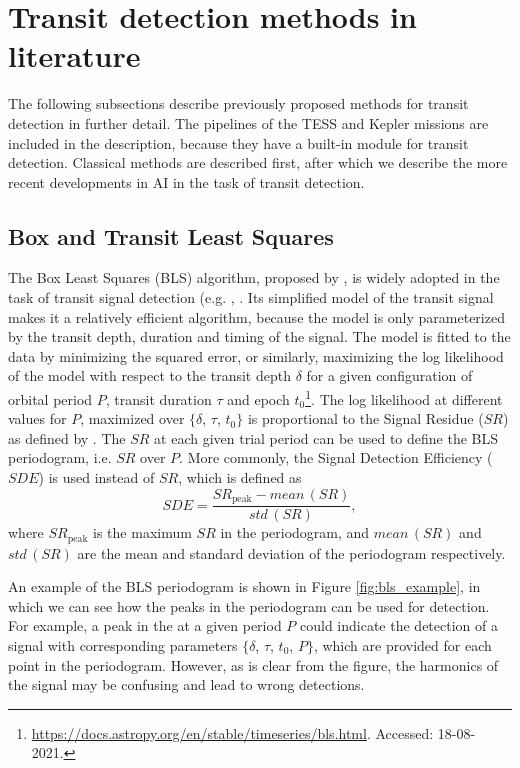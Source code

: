 
\section{Transit detection methods in literature}
\label{sec:detection_lit}

The following subsections describe previously proposed methods for transit detection in further detail. The pipelines of the TESS and Kepler missions are included in the description, because they have a built-in module for transit detection. Classical methods are described first, after which we describe the more recent developments in AI in the task of transit detection.

\subsection{Box and Transit Least Squares}

The Box Least Squares (BLS) algorithm, proposed by \cite{kovacs2002box}, is widely adopted in the task of transit signal detection (e.g. \cite{kunimoto2020searching}, \cite{rizzuto2020tess}. Its simplified model of the transit signal makes it a relatively efficient algorithm, because the model is only parameterized by the transit depth, duration and timing of the signal. The model is fitted to the data by minimizing the squared error, or similarly, maximizing the log likelihood of the model with respect to the transit depth $\delta$ for a given configuration of orbital period $P$, transit duration $\tau$ and epoch $t_0$\footnote{\url{https://docs.astropy.org/en/stable/timeseries/bls.html}. Accessed: 18-08-2021.}. The log likelihood at different values for $P$, maximized over $\{\delta$, $\tau$, $t_0\}$ is proportional to the Signal Residue ($SR$) as defined by \cite{kovacs2002box}. The $SR$ at each given trial period can be used to define the BLS periodogram, i.e. $SR$ over $P$. More commonly, the Signal Detection Efficiency ($SDE$) is used instead of $SR$, which is defined as
\begin{equation}
    SDE = \frac{SR_{\text{peak}} - \textit{mean}\,(SR)} {\textit{std}\,(SR)},
\end{equation}
where $SR_{\text{peak}}$ is the maximum $SR$ in the periodogram, and $\textit{mean}\,(SR)$ and $\textit{std}\,(SR)$ are the mean and standard deviation of the periodogram respectively.

An example of the BLS periodogram is shown in Figure \ref{fig:bls_example}, in which we can see how the peaks in the periodogram can be used for detection. For example, a peak in the at a given period $P$ could indicate the detection of a signal with corresponding parameters $\{\delta$, $\tau$, $t_0$, $P\}$, which are provided for each point in the periodogram. However, as is clear from the figure, the harmonics of the signal may be confusing and lead to wrong detections.

